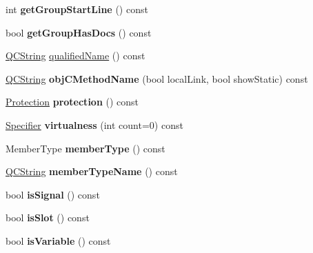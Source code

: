 \begin{DoxyCompactItemize}
int {\bfseries get\+Group\+Start\+Line} () const
\item 
\mbox{\label{class_member_def_a1588d98b02bb17673231aacbb29cca8f}} 
bool {\bfseries get\+Group\+Has\+Docs} () const
\item 
\mbox{\hyperlink{class_q_c_string}{Q\+C\+String}} \mbox{\hyperlink{class_member_def_a910beace3eb5065c82c9c9f452532dfc}{qualified\+Name}} () const
\item 
\mbox{\label{class_member_def_a75dda234e3dcf4baece9e6050a11751c}} 
\mbox{\hyperlink{class_q_c_string}{Q\+C\+String}} {\bfseries obj\+C\+Method\+Name} (bool local\+Link, bool show\+Static) const
\item 
\mbox{\label{class_member_def_a489ef9b86a7677efc378efa875080323}} 
\mbox{\hyperlink{types_8h_a90e352184df58cd09455fe9996cd4ded}{Protection}} {\bfseries protection} () const
\item 
\mbox{\label{class_member_def_ad2aa6f4d1b1d470775cd57c2248f9d63}} 
\mbox{\hyperlink{types_8h_ab16236bdd10ddf4d73a9847350f0017e}{Specifier}} {\bfseries virtualness} (int count=0) const
\item 
\mbox{\label{class_member_def_a92aa5da23b5cb8fa37b3a095691033df}} 
Member\+Type {\bfseries member\+Type} () const
\item 
\mbox{\label{class_member_def_a1cb042cbb925dbb7531d45b4c04d5762}} 
\mbox{\hyperlink{class_q_c_string}{Q\+C\+String}} {\bfseries member\+Type\+Name} () const
\item 
\mbox{\label{class_member_def_a9b22294b11cd4ba9db26ba48cd06f506}} 
bool {\bfseries is\+Signal} () const
\item 
\mbox{\label{class_member_def_ac63eaf3b358abc36158102c2cea08c3b}} 
bool {\bfseries is\+Slot} () const
\item 
\mbox{\label{class_member_def_ae7638398de734c90296a3c8b616c6220}} 
bool {\bfseries is\+Variable} () const
\item 
\mbox{\label{class_member_def_a57f6ee37a91ea07e8d231e3b55514566}} 

\end{DoxyCompactItemize}
